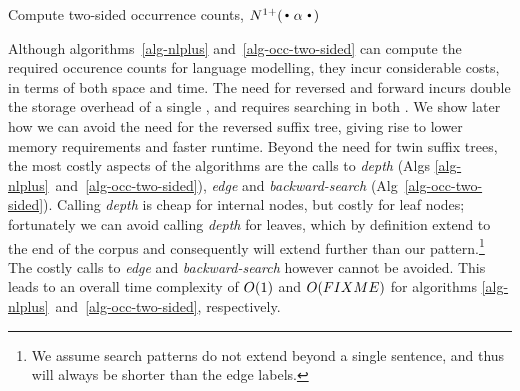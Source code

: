 \begin{algorithm}[th]
  \caption{Compute two-sided occurrence counts, $\nlplus{\dotpatdot}$ 
    \label{alg:n1plusfb}}
  \begin{algorithmic}[1]
        \Else
           \For{$\chf \gets \children{\tf}{\nf}$} 
            \EndFor
        \EndIf
      \State {}
    \EndFunction
  \end{algorithmic}
\label{alg-occ-two-sided}
\end{algorithm}

Although algorithms~\ref{alg-nlplus} and~\ref{alg-occ-two-sided} can
compute the required occurence counts for \ngram language modelling,
they incur considerable costs, in terms of both space and time. 
The need for reversed and forward \CST incurs double the
storage overhead of a single \CST, and requires searching in both
\CSTs. We show later how we can avoid the need for the reversed suffix 
tree, giving rise to lower memory requirements and
faster runtime. Beyond the need for twin suffix trees, the most costly
aspects of the algorithms are the calls to \emph{depth} (Algs 
\ref{alg-nlplus}~and~\ref{alg-occ-two-sided}), \emph{edge} and 
\emph{backward-search} (Alg~\ref{alg-occ-two-sided}).
Calling \emph{depth} is cheap for internal nodes, but costly for leaf
nodes; fortunately we can avoid calling \emph{depth} for leaves, which
by definition extend to the end of the corpus and consequently will
extend further than our pattern.\footnote{We assume search patterns do
not extend beyond a single sentence, and thus will always be shorter
than the edge labels.}
The costly calls to \emph{edge} and \emph{backward-search} however cannot be
avoided.
This leads to an overall time complexity of $O(1)$ and $O(FIXME)$ for
algorithms \ref{alg-nlplus}~and~\ref{alg-occ-two-sided}, respectively.

